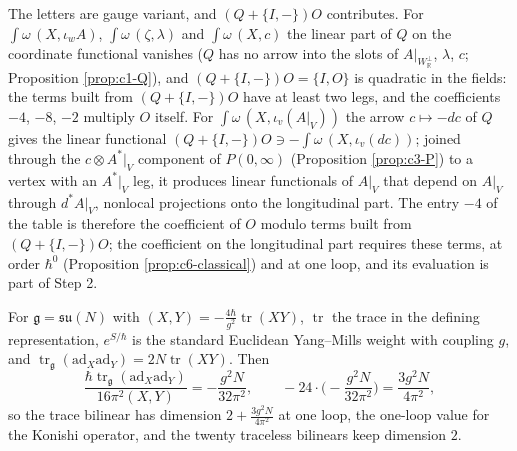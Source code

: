 \begin{remark}
\label{rem:c6-AV}
The letters are gauge variant, and $(Q+\{I,-\})O$ contributes. For $\int\omega\,(X,\iota_wA)$, $\int\omega\,(\zeta,\lambda)$ and $\int\omega\,(X,c)$ the linear part of $Q$ on the coordinate functional vanishes ($Q$ has no arrow into the slots of $A|_{W_{\mathbb R}^\perp}$, $\lambda$, $c$; Proposition \ref{prop:c1-Q}), and $(Q+\{I,-\})O=\{I,O\}$ is quadratic in the fields: the terms built from $(Q+\{I,-\})O$ have at least two legs, and the coefficients $-4$, $-8$, $-2$ multiply $O$ itself. For $\int\omega\,(X,\iota_v(A|_V))$ the arrow $c\mapsto-dc$ of $Q$ gives the linear functional $(Q+\{I,-\})O\ni-\int\omega\,(X,\iota_v(dc))$; joined through the $c\otimes A^*|_V$ component of $P(0,\infty)$ (Proposition \ref{prop:c3-P}) to a vertex with an $A^*|_V$ leg, it produces linear functionals of $A|_V$ that depend on $A|_V$ through $d^*A|_V$, nonlocal projections onto the longitudinal part. The entry $-4$ of the table is therefore the coefficient of $O$ modulo terms built from $(Q+\{I,-\})O$; the coefficient on the longitudinal part requires these terms, at order $\hbar^0$ (Proposition \ref{prop:c6-classical}) and at one loop, and its evaluation is part of Step 2.
\end{remark}

\begin{remark}
\label{rem:c6-konishi}
For $\mathfrak g=\mathfrak{su}(N)$ with $(X,Y)=-\frac{4\hbar}{g^2}\operatorname{tr}(XY)$, $\operatorname{tr}$ the trace in the defining representation, $e^{S/\hbar}$ is the standard Euclidean Yang--Mills weight with coupling $g$, and $\operatorname{tr}_{\mathfrak g}(\mathrm{ad}_X\mathrm{ad}_Y)=2N\operatorname{tr}(XY)$. Then
\[
\frac{\hbar\operatorname{tr}_{\mathfrak g}(\mathrm{ad}_X\mathrm{ad}_Y)}{16\pi^2(X,Y)}=-\frac{g^2N}{32\pi^2},\qquad -24\cdot\Big(-\frac{g^2N}{32\pi^2}\Big)=\frac{3g^2N}{4\pi^2},
\]
so the trace bilinear has dimension $2+\frac{3g^2N}{4\pi^2}$ at one loop, the one-loop value for the Konishi operator, and the twenty traceless bilinears keep dimension $2$.
\end{remark}

